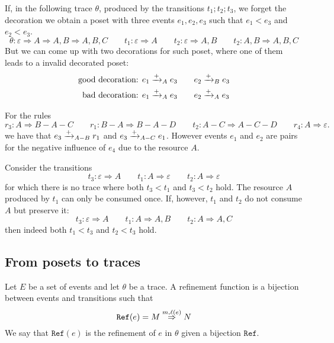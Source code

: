 \begin{example}
  If, in the following trace $\theta$, produced by the transitions $t_1;t_2;t_3$, we forget the decoration we obtain a poset with three events $e_1,e_2,e_3$ such that $e_1<e_3$ and $e_2<e_3$.
  \[
  \theta:\varepsilon \Rightarrow A \Rightarrow A,B\Rightarrow A,B,C\qquad t_1: \varepsilon \Rightarrow A\qquad t_2: \varepsilon\Rightarrow A,B\qquad t_2: A,B\Rightarrow A,B,C
  \]
  But we can come up with two decorations for such poset, where one of them leads to a invalid decorated poset:
  \begin{align*}
  \text{good decoration: }&e_1\mathrel{\xrightarrow{+}}_A e_3\qquad e_2\mathrel{\xrightarrow{+}}_B e_3\\
  \text{bad decoration: }&e_1\mathrel{\xrightarrow{+}}_A e_3\qquad e_2\mathrel{\xrightarrow{+}}_A e_3
  \end{align*}
\end{example}

\begin{example}
  For the rules
  \[
  r_3: A \Rightarrow B-A-C\qquad r_1: B-A\Rightarrow B-A-D \qquad t_2: A-C\Rightarrow A-C-D\qquad r_4: A\Rightarrow \varepsilon.
  \]
  we have that $e_3\mathrel{\xrightarrow{+}}_{A-B} r_1$ and $e_3\mathrel{\xrightarrow{+}}_{A-C} e_1$. However events $e_1$ and $e_2$ are pairs for the negative influence of $e_4$ due to the resource $A$.
\end{example}

\begin{example}
  Consider the transitions
  \[
  t_3: \varepsilon \Rightarrow A\qquad t_1: A\Rightarrow \varepsilon \qquad t_2: A\Rightarrow \varepsilon
  \]
  for which there is no trace where both $t_3<t_1$ and $t_3<t_2$ hold. The resource $A$ produced by $t_1$ can only be consumed once.
  If, however, $t_1$ and $t_2$ do not consume $A$ but preserve it:
  \[
  t_3: \varepsilon \Rightarrow A\qquad t_1: A\Rightarrow A,B \qquad t_2: A\Rightarrow A,C
  \]
  then indeed both $t_1<t_3$ and $t_2<t_3$ hold.
\end{example}

\subsection{From posets to traces}

\begin{definition}
  Let $E$ be a set of events and let $\theta$ be a trace. A refinement function is a bijection between events and transitions such that
  \[
  \mathtt{Ref}(e) = M\overset{m,\ell(e)}{\Rightarrow}N
  \]
  We say that $\mathtt{Ref}(e)$ is the refinement of $e$ in $\theta$ given a bijection $\mathtt{Ref}$.
\end{definition}

